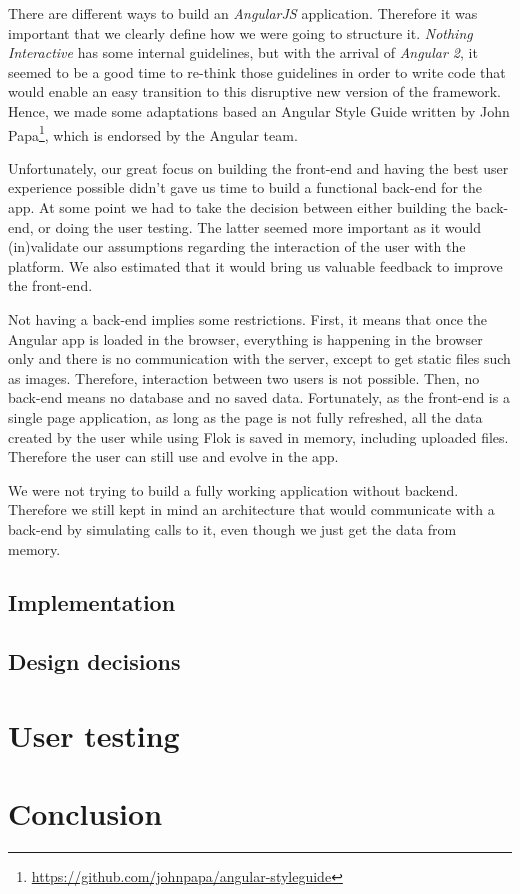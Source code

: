 \documentclass[a4paper,12pt, oneside]{article}
\begin{document}
There are different ways to build an \emph{AngularJS} application.
Therefore it was important that we clearly define how we were going to structure it.
\emph{Nothing Interactive} has some internal guidelines, but with the arrival of \emph{Angular 2}, it seemed to be a good time to re-think those guidelines in order to write code that would enable an easy transition to this disruptive new version of the framework.
Hence, we made some adaptations based an Angular Style Guide written by John Papa\footnote{\url{https://github.com/johnpapa/angular-styleguide}}, which is endorsed by the Angular team.


Unfortunately, our great focus on building the front-end and having the best user experience possible didn't gave us time to build a functional back-end for the app.
At some point we had to take the decision between either building the back-end, or doing the user testing.
The latter seemed more important as it would (in)validate our assumptions regarding the interaction of the user with the platform.
We also estimated that it would bring us valuable feedback to improve the front-end.

Not having a back-end implies some restrictions.
First, it means that once the Angular app is loaded in the browser, everything is happening in the browser only and there is no communication with the server, except to get static files such as images.
Therefore, interaction between two users is not possible.
Then, no back-end means no database and no saved data.
Fortunately, as the front-end is a single page application, as long as the page is not fully refreshed, all the data created by the user while using Flok is saved in memory, including uploaded files.
Therefore the user can still use and evolve in the app.

We were not trying to build a fully working application without backend.
Therefore we still kept in mind an architecture that would communicate with a back-end by simulating calls to it, even though we just get the data from memory.

\subsection{Implementation}

\subsection{Design decisions}

\section{User testing}

\section{Conclusion}

\clearpage


\end{document}
